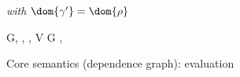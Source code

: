 \begin{figure}
{    \hfill\textit{ with }$\dom{\gamma'} = \dom{\rho}$%
   \begin{smathpar}
      {
         G, \gamma, \rho, V
         \closeDefs
         G \disjunion {},
      }
   \end{smathpar}
   }
   \caption{Core semantics (dependence graph): evaluation}
\end{figure}

